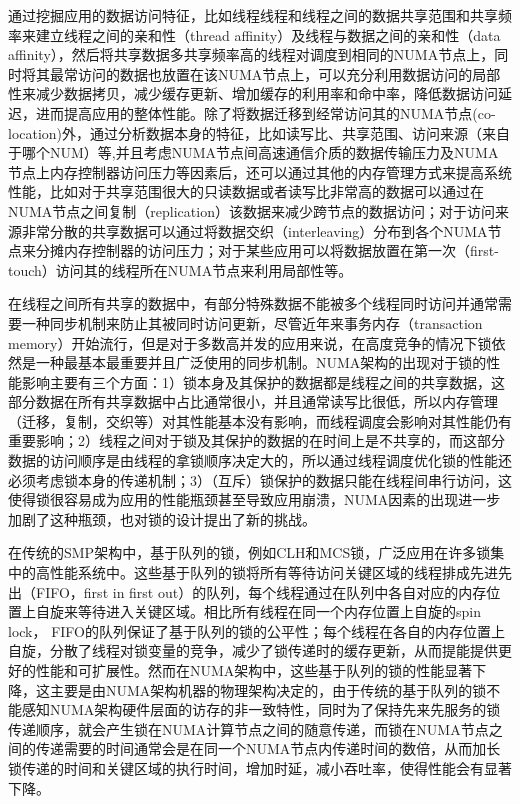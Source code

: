 通过挖掘应用的数据访问特征，比如线程线程和线程之间的数据共享范围和共享频率来建立线程之间的亲和性（thread affinity）及线程与数据之间的亲和性（data affinity）\cite{diener2014kmaf}\cite{azimi2009enhancing}\cite{tikir2008hardware}，然后将共享数据多共享频率高的线程对调度到相同的NUMA节点上，同时将其最常访问的数据也放置在该NUMA节点上，可以充分利用数据访问的局部性来减少数据拷贝，减少缓存更新、增加缓存的利用率和命中率，降低数据访问延迟，进而提高应用的整体性能\cite{chishti2005optimizing}。除了将数据迁移到经常访问其的NUMA节点(co-location)外，通过分析数据本身的特征，比如读写比、共享范围、访问来源（来自于哪个NUM）等,并且考虑NUMA节点间高速通信介质的数据传输压力及NUMA节点上内存控制器访问压力等因素后，还可以通过其他的内存管理方式来提高系统性能\cite{dashti2013traffic}\cite{molka2011memory}，比如对于共享范围很大的只读数据或者读写比非常高的数据可以通过在NUMA节点之间复制（replication）该数据来减少跨节点的数据访问；对于访问来源非常分散的共享数据可以通过将数据交织（interleaving）分布到各个NUMA节点来分摊内存控制器的访问压力；对于某些应用可以将数据放置在第一次（first-touch）访问其的线程所在NUMA节点来利用局部性等。

在线程之间所有共享的数据中，有部分特殊数据不能被多个线程同时访问并通常需要一种同步机制来防止其被同时访问更新，尽管近年来事务内存（transaction memory）开始流行，但是对于多数高并发的应用来说，在高度竞争的情况下锁依然是一种最基本最重要并且广泛使用的同步机制\cite{tallent2010analyzing}\cite{johnson2010decoupling}。NUMA架构的出现对于锁的性能影响主要有三个方面：1）锁本身及其保护的数据都是线程之间的共享数据，这部分数据在所有共享数据中占比通常很小，并且通常读写比很低，所以内存管理（迁移，复制，交织等）对其性能基本没有影响，而线程调度会影响对其性能仍有重要影响；2）线程之间对于锁及其保护的数据的在时间上是不共享的，而这部分数据的访问顺序是由线程的拿锁顺序决定大的，所以通过线程调度优化锁的性能还必须考虑锁本身的传递机制；3）（互斥）锁保护的数据只能在线程间串行访问，这使得锁很容易成为应用的性能瓶颈甚至导致应用崩溃，NUMA因素的出现进一步加剧了这种瓶颈，也对锁的设计提出了新的挑战。

在传统的SMP架构中，基于队列的锁，例如CLH\cite{craig1993building}\cite{magnusson1994queue}\cite{scott2013shared}和MCS锁\cite{mellor1991algorithms}\cite{scott2013shared}，广泛应用在许多锁集中的高性能系统中\cite{dice2011flat}。这些基于队列的锁将所有等待访问关键区域的线程排成先进先出（FIFO，first in first out）的队列，每个线程通过在队列中各自对应的内存位置上自旋来等待进入关键区域。相比所有线程在同一个内存位置上自旋的spin lock， FIFO的队列保证了基于队列的锁的公平性；每个线程在各自的内存位置上自旋，分散了线程对锁变量的竞争，减少了锁传递时的缓存更新，从而提能提供更好的性能和可扩展性。然而在NUMA架构中，这些基于队列的锁的性能显著下降，这主要是由NUMA架构机器的物理架构决定的，由于传统的基于队列的锁不能感知NUMA架构硬件层面的访存的非一致特性，同时为了保持先来先服务的锁传递顺序，就会产生锁在NUMA计算节点之间的随意传递，而锁在NUMA节点之间的传递需要的时间通常会是在同一个NUMA节点内传递时间的数倍，从而加长锁传递的时间和关键区域的执行时间，增加时延，减小吞吐率，使得性能会有显著下降。

